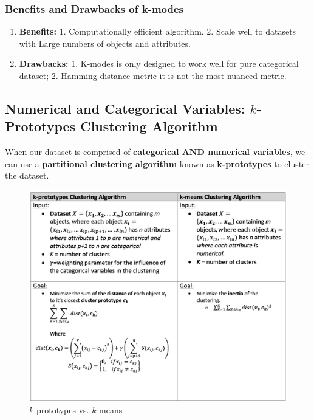 \documentclass[11pt]{elegantbook}
\begin{document}
\subsubsection*{Benefits and Drawbacks of k-modes}
\begin{enumerate}[$\bullet$]
    \item \textbf{Benefits:} 1. Computationally efficient algorithm. 2. Scale well to datasets with Large numbers of objects and attributes.
    \item \textbf{Drawbacks:} 1. K-modes is only designed to work well for pure categorical dataset; 2. Hamming distance metric it is not the most nuanced metric.
\end{enumerate}



\subsection{Numerical and Categorical Variables: $k$-Prototypes Clustering Algorithm}
When our dataset is comprised of \textbf{categorical AND numerical variables}, we can use a \textbf{partitional clustering algorithm} known as \textbf{k-prototypes} to cluster the dataset.
\begin{center}\begin{figure}[htbp]
    \centering
    \includegraphics[scale=0.2]{kprototype.png}
    \caption{$k$-prototypes vs. $k$-means}
    \label{}
\end{figure}\end{center}
\end{document}
